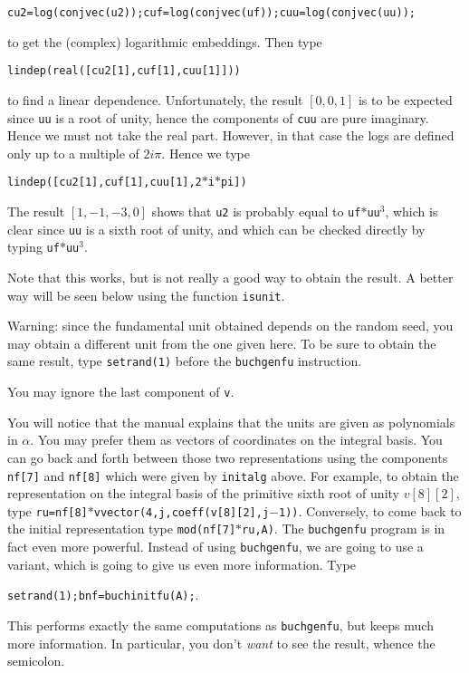 {\tt cu2=log(conjvec(u2));cuf=log(conjvec(uf));cuu=log(conjvec(uu));}

to get the (complex) logarithmic embeddings. Then type

{\tt lindep(real([cu2[1],cuf[1],cuu[1]]))} 

to find a linear dependence. Unfortunately, the result $[0,0,1]$ is to be
expected since {\tt uu} is a root of unity, hence the components of {\tt cuu}
are pure imaginary. Hence we must not take the real part. However, in that
case the logs are defined only up to a multiple of $2i\pi$. Hence we type

{\tt lindep([cu2[1],cuf[1],cuu[1],2$*$i$*$pi])} 

The result $[1,-1,-3,0]$ shows that {\tt u2} is probably equal to 
{\tt uf$*$uu$^3$}, which is clear since {\tt uu} is a sixth root of unity,
and which can be checked directly by typing {\tt uf$*$uu$^3$}.

Note that this works, but is not really a good way to obtain the result.
A better way will be seen below using the function {\tt isunit}.

Warning: since the fundamental unit obtained depends on the
random seed, you may obtain a different unit from the one given here. To be
sure to obtain the same result, type {\tt setrand(1)} before the 
{\tt buchgenfu} instruction.

You may ignore the last component of {\tt v}.

You will notice that the manual explains that the units are given as 
polynomials in $\alpha$. You may prefer them as vectors of coordinates on
the integral basis. You can go back and forth between those two representations
using the components {\tt nf[7]} and {\tt nf[8]} which were given by
{\tt initalg} above. For example, to obtain the representation on the integral
basis of the primitive sixth root of unity $v[8][2]$, type
{\tt ru=nf[8]$*$vvector(4,j,coeff(v[8][2],j$-$1))}. Conversely, to come back to
the initial representation type {\tt mod(nf[7]$*$ru,A)}.
\smallskip
The {\tt buchgenfu} program is in fact even more powerful. Instead of using
{\tt buchgenfu}, we are going to use a variant, which is going to give us
even more information. Type 

{\tt setrand(1);bnf=buchinitfu(A);}.

This performs exactly the same computations as {\tt buchgenfu}, but keeps much
more information. In particular, you don't {\it want} to see the result, 
whence the semicolon.

